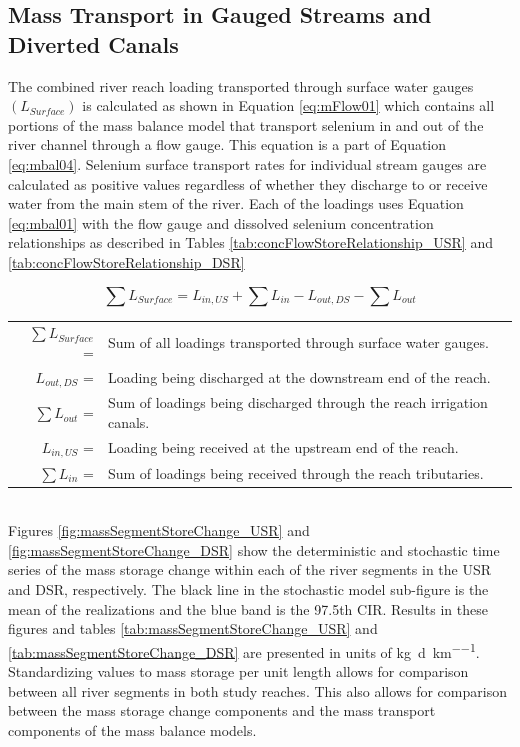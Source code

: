 \begin{linenumbers}

\clearpage{}
\section{Mass Transport in Gauged Streams and Diverted Canals}
\label{sec:MassTransport}


The combined river reach loading transported through surface water gauges $(L_{Surface})$ is calculated as shown in Equation \ref{eq:mFlow01} which contains all portions of the mass balance model that transport selenium in and out of the river channel through a flow gauge.  This equation is a part of Equation \ref{eq:mbal04}.  Selenium surface transport rates for individual stream gauges are calculated as positive values regardless of whether they discharge to or receive water from the main stem of the river.  Each of the loadings uses Equation \ref{eq:mbal01} with the flow gauge and dissolved selenium concentration relationships as described in Tables \ref{tab:concFlowStoreRelationship_USR} and \ref{tab:concFlowStoreRelationship_DSR}

\begin{equation}
	\sum L_{Surface} =  L_{in,US} + \sum L_{in} - L_{out,DS} - \sum L_{out} 
\label{eq:mFlow01}
\end{equation}
\begin{tabular}{r p{5.25in}}
	$ \sum L_{Surface} $ = & Sum of all loadings transported through surface water gauges.\\
	$ L_{out,DS} $ = & Loading being discharged at the downstream end of the reach. \\
	$ \sum L_{out} $ = & Sum of loadings being discharged through the reach irrigation canals.\\
	$ L_{in,US} $ = & Loading being received at the upstream end of the reach. \\
	$ \sum L_{in} $ = & Sum of loadings being received through the reach tributaries.\\
\end{tabular}\\

Figures \ref{fig:massSegmentStoreChange_USR} and \ref{fig:massSegmentStoreChange_DSR} show the deterministic and stochastic time series of the mass storage change within each of the river segments in the USR and DSR, respectively.  The black line in the stochastic model sub-figure is the mean of the realizations and the blue band is the 97.5th CIR.   Results in these figures and tables \ref{tab:massSegmentStoreChange_USR} and \ref{tab:massSegmentStoreChange_DSR} are presented in units of \si{\kilo\gram\per\day\per\kilo\meter}.  Standardizing values to mass storage per unit length allows for comparison between all river segments in both study reaches.  This also allows for comparison between the mass storage change components and the mass transport components of the mass balance models.


\end{linenumbers}
